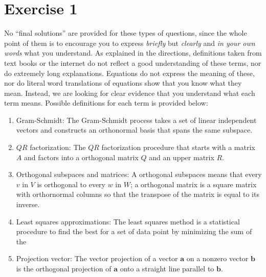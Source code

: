 \section{Exercise 1}

No ``final solutions'' are provided for these types of questions, since the
whole point of them is to encourage you to express \emph{briefly} but
\emph{clearly} and \emph{in your own words} what you understand. As
explained in the directions, definitions taken from text books or the
internet do not reflect a good understanding of these terms, nor do
extremely long explanations. Equations do not express the meaning of these,
nor do literal word translations of equations show that you know what they
mean. Instead, we are looking for clear evidence that you understand what
each term means. Possible definitions for each term is provided below: 

\begin{mdframed}[style=MyFrame]
    \begin{enumerate}[label=(\alph*)]
        \item Gram-Schmidt: The Gram-Schmidt process takes a set of linear
            independent vectors and constructs an orthonormal basis  that
            spans the same subspace. 
        \item $QR$ factorization: The $QR$ factorization procedure that
            starts with a matrix $A$ and factors into a orthogonal matrix
            $Q$ and an upper matrix $R$.
        \item Orthogonal subspaces and matrices: A orthogonal
            subspaces means that every $v$ in $V$ is orthogonal to every
            $w$ in $W$; a orthogonal matrix is a square matrix with
            orthornormal columns so that the transpose of the matrix is
            equal to its inverse.  
        \item Least squares approximations: The least squares method is a
            statistical procedure to find the best for a set of data point
            by minimizing the sum of the 
        \item Projection vector: The vector projection of a vector
            $\mathbf{a}$ on a nonzero vector $\mathbf{b}$ is the orthogonal
            projection of $\mathbf{a}$ onto a straight line parallel to
            $\mathbf{b}$.
    \end{enumerate}
\end{mdframed}
